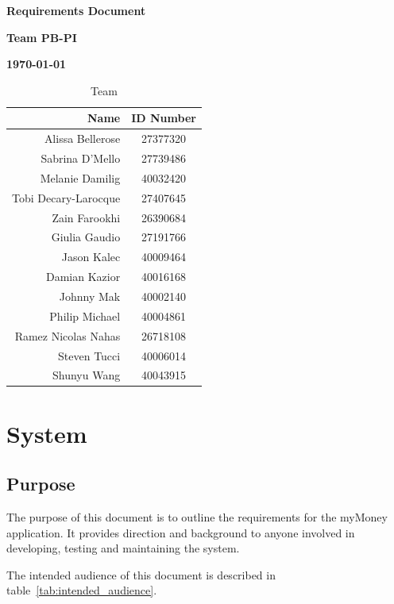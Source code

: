\documentclass[12pt]{article}
\begin{document}
\vspace*{0.5in}
\centerline{\bf\Large Requirements Document}

\vspace*{0.5in}
\centerline{\bf\Large Team PB-PI}

\vspace*{0.5in}
\centerline{\bf\Large \today}

\vspace*{1.5in}
\begin{table}[htbp]
\caption{Team}
\begin{center}
\begin{tabular}{|r | c|}
\hline
Name & ID Number \\
\hline\hline
Alissa Bellerose & 27377320 \\
Sabrina D'Mello & 27739486 \\
Melanie Damilig & 40032420 \\
Tobi Decary-Larocque & 27407645 \\
Zain Farookhi & 26390684 \\
Giulia Gaudio & 27191766 \\
Jason Kalec & 40009464 \\
Damian Kazior & 40016168 \\
Johnny Mak & 40002140 \\
Philip Michael & 40004861 \\
Ramez Nicolas Nahas & 26718108 \\
Steven Tucci & 40006014 \\
Shunyu Wang & 40043915 \\
\hline
\end{tabular}
\end{center}
\end{table}

\clearpage

\section{System}

\subsection{Purpose}
The purpose of this document is to outline the requirements for the myMoney application. It provides direction and background to anyone involved in developing, testing and maintaining the system.

The intended audience of this document is described in table~\ref{tab:intended_audience}.
\end{document}
